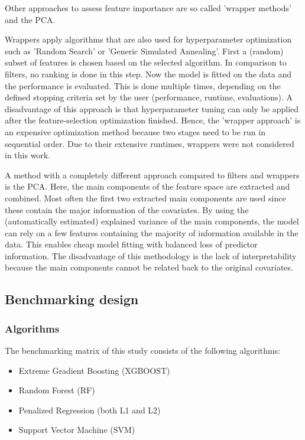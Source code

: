 \documentclass[letterpaper, peerreview]{IEEEtran}
\begin{document}
\noindent Other approaches to assess feature importance are so called 'wrapper methods' and the \ac{PCA}\cite{das2001, jolliffe2016}.

\noindent Wrappers \cite{chandrashekar2014, kohavi1997} apply algorithms that are also used for hyperparameter optimization such as 'Random Search' or 'Generic Simulated Annealing'.
First a (random) subset of features is chosen based on the selected algorithm.
In comparison to filters, no ranking is done in this step.
Now the model is fitted on the data and the performance is evaluated.
This is done multiple times, depending on the defined stopping criteria set by the user (performance, runtime, evaluations).
A disadvantage of this approach is that hyperparameter tuning can only be applied after the feature-selection optimization finished.
Hence, the 'wrapper approach' is an expensive optimization method because two stages need to be run in sequential order.
Due to their extensive runtimes, wrappers were not considered in this work.

A method with a completely different approach compared to filters and wrappers is the \ac{PCA}\cite{pearson1901, jolliffe2016}.
Here, the main components of the feature space are extracted and combined.
Most often the first two extracted main components are used since these contain the major information of the covariates.
By using the (automatically estimated) explained variance of the main components, the model can rely on a few features containing the majority of information available in the data.
This enables cheap model fitting with balanced loss of predictor information.
The disadvantage of this methodology is the lack of interpretability because the main components cannot be related back to the original covariates.

\subsection{Benchmarking design}

\subsubsection{Algorithms}

\noindent The benchmarking matrix of this study consists of the following algorithms:

\begin{itemize}
	\item  Extreme Gradient Boosting (XGBOOST)
	\item  Random Forest (RF)
	\item  Penalized Regression (both L1 and L2)
	\item  Support Vector Machine (SVM)
\end{itemize}
\end{document}
